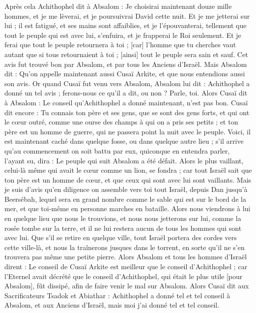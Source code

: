\begin{multicols}{2}
\VerseOne{}Après cela Achithophel dit à Absalom : Je choisirai maintenant douze mille hommes, et je me lèverai, et je poursuivrai David cette nuit.
Et je me jetterai sur lui ; il est fatigué, et ses mains sont affaiblies, et je l'épouvanterai, tellement que tout le peuple qui est avec lui, s'enfuira, et je frapperai le Roi seulement.
Et je ferai que tout le peuple retournera à toi ; [car] l'homme que tu cherches vaut autant que si tous retournaient à toi ; [ainsi] tout le peuple sera sain et sauf.
Cet avis fut trouvé bon par Absalom, et par tous les Anciens d'Israël.
Mais Absalom dit : Qu'on appelle maintenant aussi Cusaï Arkite, et que nous entendions aussi son avis.
Or quand Cusaï fut venu vers Absalom, Absalom lui dit : Achithophel a donné un tel avis ; ferons-nous ce qu'il a dit, ou non ? Parle, toi.
Alors Cusaï dit à Absalom : Le conseil qu'Achithophel a donné maintenant, n'est pas bon.
Cusaï dit encore : Tu connais ton père et ses gens, que se sont des gens forts, et qui ont le cœur outré, comme une ourse des champs à qui on a pris ses petits ; et ton père est un homme de guerre, qui ne passera point la nuit avec le peuple.
Voici, il est maintenant caché dans quelque fosse, ou dans quelque autre lieu ; s'il arrive qu'au commencement on soit battu par eux, quiconque en entendra parler, l'ayant su, dira : Le peuple qui suit Absalom a été défait.
Alors le plus vaillant, celui-là même qui avait le cœur comme un lion, se fondra ; car tout Israël sait que ton père est un homme de cœur, et que ceux qui sont avec lui sont vaillants.
Mais je suis d'avis qu'en diligence on assemble vers toi tout Israël, depuis Dan jusqu'à Beersébah, lequel sera en grand nombre comme le sable qui est sur le bord de la mer, et que toi-même en personne marches en bataille.
Alors nous viendrons à lui en quelque lieu que nous le trouvions, et nous nous jetterons sur lui, comme la rosée tombe sur la terre, et il ne lui restera aucun de tous les hommes qui sont avec lui.
Que s'il se retire en quelque ville, tout Israël portera des cordes vers cette ville-là, et nous la traînerons jusques dans le torrent, en sorte qu'il ne s'en trouvera pas même une petite pierre.
Alors Absalom et tous les hommes d'Israël dirent : Le conseil de Cusaï Arkite est meilleur que le conseil d'Achithophel ; car l'Eternel avait décrété que le conseil d'Achithophel, qui était le plus utile [pour Absalom], fût dissipé, afin de faire venir le mal sur Absalom.
Alors Cusaï dit aux Sacrificateurs Tsadok et Abiathar : Achithophel a donné tel et tel conseil à Absalom, et aux Anciens d'Israël, mais moi j'ai donné tel et tel conseil.

\end{multicols}
